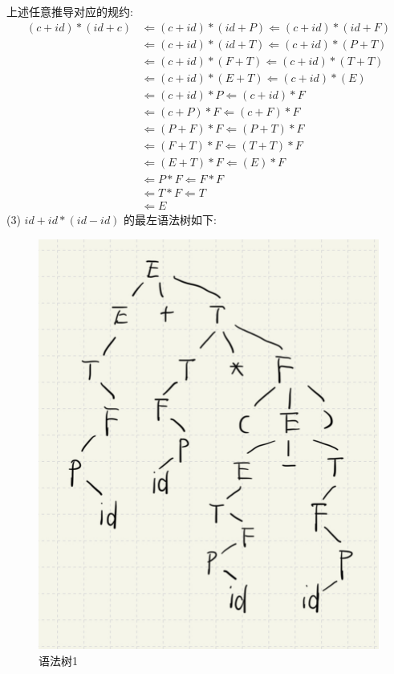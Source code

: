 \documentclass{article}
\begin{document}
上述任意推导对应的规约:
\begin{align*}
    (c + id) * (id + c) & \Leftarrow (c + id) * (id + P) \Leftarrow (c + id) * (id + F) \\
                        & \Leftarrow (c + id) * (id + T) \Leftarrow (c + id) * (P + T) \\
                        & \Leftarrow (c + id) * (F + T) \Leftarrow (c + id) * (T + T) \\
                        & \Leftarrow (c + id) * (E + T) \Leftarrow (c + id) * (E) \\
                        & \Leftarrow (c + id) * P \Leftarrow (c + id) * F \\
                        & \Leftarrow (c + P) * F \Leftarrow (c + F) * F \\
                        & \Leftarrow (P + F) * F \Leftarrow (P + T) * F \\
                        & \Leftarrow (F + T) * F \Leftarrow (T + T) * F \\
                        & \Leftarrow (E + T) * F \Leftarrow (E) * F \\
                        & \Leftarrow P * F \Leftarrow F * F \\
                        & \Leftarrow T * F \Leftarrow T \\
                        & \Leftarrow E
\end{align*}
\newpage
(3)
$id + id * (id - id)$ 的最左语法树如下: \\
\begin{figure}[htbp]
    \centering
    \includegraphics[scale=0.1]{tree1.jpg}
    \caption{语法树1}
\end{figure}
\end{document}
